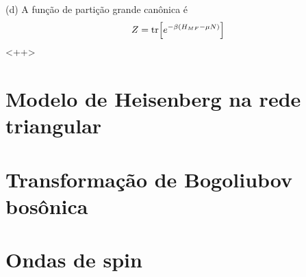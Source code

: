 \documentclass[a4paper,10pt]{article}
\begin{document}
\pagebreak

(d) A função de partição grande canônica é
$$
Z = \tr[e^{-\beta(H_{MF} - \mu N)}]
$$
<++>






\pagebreak

\section{Modelo de Heisenberg na rede triangular}


\pagebreak

\section{Transformação de Bogoliubov bosônica}



\pagebreak

\section{Ondas de spin}
\end{document}
